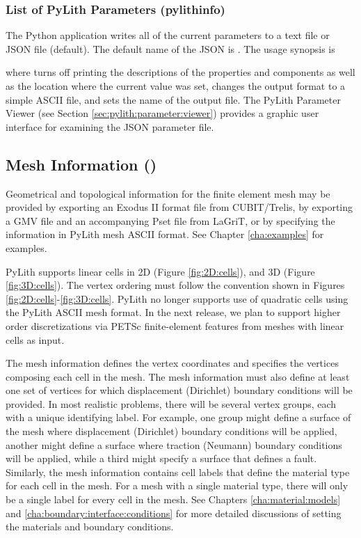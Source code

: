 \subsubsection{List of PyLith Parameters ({\ttfamily pylithinfo})}
\label{sec:pylithinfo}

The Python application  writes all of the current
parameters to a text file or JSON file (default). The default name of the JSON is .
The usage synopsis is
\begin{shell}
$ pylithinfo [--verbose-false] [--format={ascii,json} [--filename=pylith_parameters.json] PYLITH_ARGS
\end{shell}
where  turns off printing the descriptions of
the properties and components as well as the location where the
current value was set,  changes the
output format to a simple ASCII file, and
 sets the name of the
output file. The PyLith Parameter Viewer (see Section
\ref{sec:pylith:parameter:viewer}) provides a graphic user interface
for examining the JSON parameter file. 


\subsection{Mesh Information ()}

Geometrical and topological information for the finite element mesh
may be provided by exporting an Exodus II format file from
CUBIT/Trelis, by exporting a GMV file and an accompanying Pset file
from LaGriT, or by specifying the information in PyLith mesh ASCII
format. See Chapter \vref{cha:examples} for examples.

PyLith supports linear cells in 2D (Figure \vref{fig:2D:cells}), and
3D (Figure \vref{fig:3D:cells}).  The vertex ordering must follow the
convention shown in Figures \vref{fig:2D:cells}-\vref{fig:3D:cells}.
PyLith no longer supports use of quadratic cells using the PyLith
ASCII mesh format. In the next release, we plan to support higher
order discretizations via PETSc finite-element features from meshes
with linear cells as input.

The mesh information defines the vertex coordinates and specifies
the vertices composing each cell in the mesh. The mesh information
must also define at least one set of vertices for which displacement
(Dirichlet) boundary conditions will be provided. In most realistic
problems, there will be several vertex groups, each with a unique
identifying label. For example, one group might define a surface of
the mesh where displacement (Dirichlet) boundary conditions will be
applied, another might define a surface where traction (Neumann) boundary
conditions will be applied, while a third might specify a surface
that defines a fault. Similarly, the mesh information contains cell
labels that define the material type for each cell in the mesh. For
a mesh with a single material type, there will only be a single label
for every cell in the mesh. See Chapters \vref{cha:material:models}
and \vref{cha:boundary:interface:conditions} for more detailed discussions
of setting the materials and boundary conditions.

